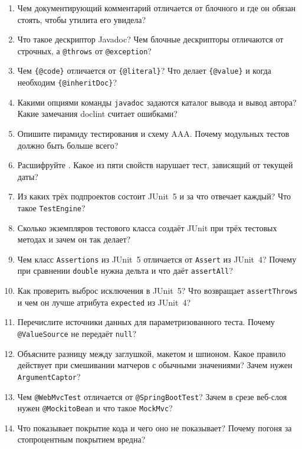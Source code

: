 \begin{enumerate}
\item Чем документирующий комментарий отличается от блочного и где он обязан стоять, чтобы утилита его увидела?
\item Что такое дескриптор Javadoc? Чем блочные дескрипторы отличаются от строчных, а \texttt{@throws} от \texttt{@exception}?
\item Чем \texttt{\{@code\}} отличается от \texttt{\{@literal\}}? Что делает \texttt{\{@value\}} и когда необходим \texttt{\{@inheritDoc\}}?
\item Какими опциями команды \texttt{javadoc} задаются каталог вывода и вывод автора? Какие замечания doclint считает ошибками?
\item Опишите пирамиду тестирования и схему AAA. Почему модульных тестов должно быть больше всего?
\item Расшифруйте . Какое из пяти свойств нарушает тест, зависящий от текущей даты?
\item Из каких трёх подпроектов состоит JUnit~5 и за что отвечает каждый? Что такое \texttt{TestEngine}?
\item Сколько экземпляров тестового класса создаёт JUnit при трёх тестовых методах и зачем он так делает?
\item Чем класс \texttt{Assertions} из JUnit~5 отличается от \texttt{Assert} из JUnit~4? Почему при сравнении \texttt{double} нужна дельта и что даёт \texttt{assertAll}?
\item Как проверить выброс исключения в JUnit~5? Что возвращает \texttt{assertThrows} и чем он лучше атрибута \texttt{expected} из JUnit~4?
\item Перечислите источники данных для параметризованного теста. Почему \texttt{@ValueSource} не передаёт \texttt{null}?
\item Объясните разницу между заглушкой, макетом и шпионом. Какое правило действует при смешивании матчеров с обычными значениями? Зачем нужен \texttt{ArgumentCaptor}?
\item Чем \texttt{@WebMvcTest} отличается от \texttt{@SpringBootTest}? Зачем в срезе веб-слоя нужен \texttt{@MockitoBean} и что такое \texttt{MockMvc}?
\item Что показывает покрытие кода и чего оно не показывает? Почему погоня за стопроцентным покрытием вредна?
\end{enumerate}

\testzadaniya

